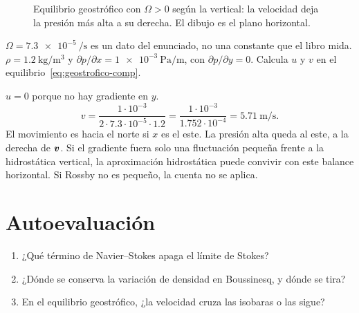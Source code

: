 \begin{figure}[ht]
\centering
{}
\caption{Equilibrio geostrófico con \(\Omega>0\) según la vertical: la velocidad deja la presión más alta a su derecha. El dibujo es el plano horizontal.}
\label{fig:geostrofico}
\end{figure}

\begin{problembox}[Intermedio]
\(\Omega=\qty{7.3e-5}{\per\second}\) es un dato del enunciado, no una constante que el libro mida. \(\rho=\qty{1.2}{\kilogram\per\cubic\metre}\) y \(\partial p/\partial x=\qty{1e-3}{\pascal\per\metre}\), con \(\partial p/\partial y=0\). Calcula \(u\) y \(v\) en el equilibrio~\eqref{eq:geostrofico-comp}.
\end{problembox}
\begin{solutionbox}
\(u=0\) porque no hay gradiente en \(y\).
\[
v=\frac{1\cdot 10^{-3}}{2\cdot 7.3\cdot 10^{-5}\cdot 1.2}
=\frac{1\cdot 10^{-3}}{1.752\cdot 10^{-4}}
=\qty{5.71}{\metre\per\second}.
\]
El movimiento es hacia el norte si \(x\) es el este. La presión alta queda al este, a la derecha de \(\boldsymbol{v}\). Si el gradiente fuera solo una fluctuación pequeña frente a la hidrostática vertical, la aproximación hidrostática puede convivir con este balance horizontal. Si Rossby no es pequeño, la cuenta no se aplica.
\end{solutionbox}

\section{Autoevaluación}
\begin{enumerate}[leftmargin=1.4em]
\item ¿Qué término de Navier--Stokes apaga el límite de Stokes?
\item ¿Dónde se conserva la variación de densidad en Boussinesq, y dónde se tira?
\item En el equilibrio geostrófico, ¿la velocidad cruza las isobaras o las sigue?
\end{enumerate}
